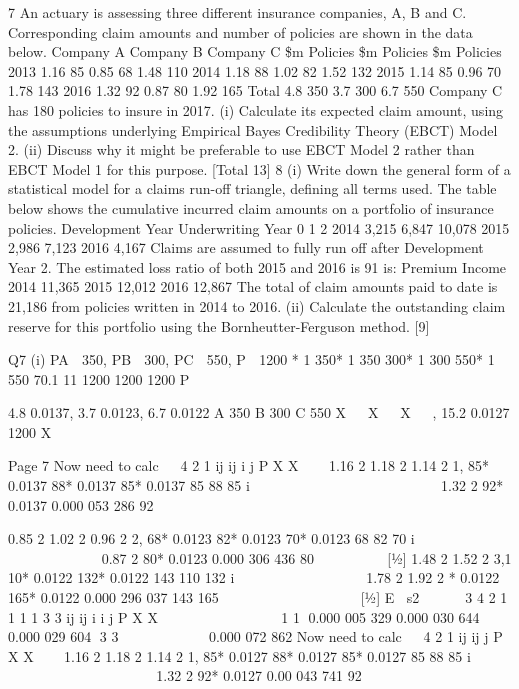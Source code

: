 \documentclass[a4paper,12pt]{article}
\begin{document}
\begin{enumerate}
7 An actuary is assessing three different insurance companies, A, B and C.
Corresponding claim amounts and number of policies are shown in the data below.
Company A Company B Company C
\$m Policies
\$m Policies \$m Policies
2013 1.16 85 0.85 68 1.48 110
2014 1.18 88 1.02 82 1.52 132
2015 1.14 85 0.96 70 1.78 143
2016 1.32 92 0.87 80 1.92 165
Total 4.8 350 3.7 300 6.7 550
Company C has 180 policies to insure in 2017.
(i) Calculate its expected claim amount, using the assumptions underlying
Empirical Bayes Credibility Theory (EBCT) Model 2. 
(ii) Discuss why it might be preferable to use EBCT Model 2 rather than EBCT
Model 1 for this purpose. 
[Total 13]
8 (i) Write down the general form of a statistical model for a claims run-off
triangle, defining all terms used.
The table below shows the cumulative incurred claim amounts on a portfolio of
insurance policies.
Development Year
Underwriting Year 0 1 2
2014 3,215 6,847 10,078
2015 2,986 7,123
2016 4,167
Claims are assumed to fully run off after Development Year 2. The estimated loss ratio of both 2015 and 2016 is 91%
is:
  Premium Income
2014 11,365
2015 12,012
2016 12,867
The total of claim amounts paid to date is 21,186 from policies written in 2014 to
2016.
(ii) Calculate the outstanding claim reserve for this portfolio using the Bornheutter-Ferguson method. [9]
\newpage

Q7 (i) PA  350, PB  300, PC  550, P  1200
* 1 350* 1 350 300* 1 300 550* 1 550 70.1
11 1200 1200 1200
P
                           

4.8 0.0137, 3.7 0.0123, 6.7 0.0122
A 350 B 300 C 550 X   X   X   , 15.2 0.0127
1200
X  

Page 7
Now need to calc   4 2
1
ij ij i
j
P X X

 
1.16 2 1.18 2 1.14 2 1, 85* 0.0137 88* 0.0137 85* 0.0137
85 88 85
i             
     
1.32 2 92* 0.0137 0.000 053 286
92
     
 

0.85 2 1.02 2 0.96 2 2, 68* 0.0123 82* 0.0123 70* 0.0123
68 82 70
i             
     
0.87 2 80* 0.0123 0.000 306 436
80
     
 
[½]
1.48 2 1.52 2 3,1 10* 0.0122 132* 0.0122 143
110 132
i         
   
1.78 2 1.92 2 * 0.0122 165* 0.0122 0.000 296 037
143 165
           
   
[½]
E s2    3 4 2
1 1
1 1
3 3 ij ij i
i j
P X X
 
     
 
 
1 1 0.000 005 329 0.000 030 644 0.000 029 604
3 3
      
 
 0.000 072 862 
Now need to calc   4 2
1
ij ij
j
P X X

 
1.16 2 1.18 2 1.14 2 1, 85* 0.0127 88* 0.0127 85* 0.0127
85 88 85
i            
     
1.32 2 92* 0.0127 0.00 043 741
92
      
 


\end{enumerate}
\end{document}
